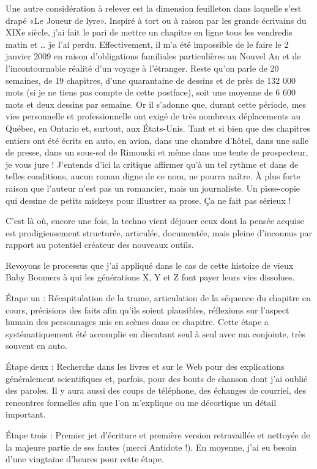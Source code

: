 \begin{Postface}
Une autre considération à relever est la dimension feuilleton dans laquelle s’est drapé «Le Joueur de lyre». Inspiré à tort ou à raison par les grands écrivains du XIXe siècle, j’ai fait le pari de mettre un chapitre en ligne tous les vendredis matin et … je l’ai perdu. Effectivement, il m’a été impossible de le faire le 2 janvier 2009 en raison d’obligations familiales particulières au Nouvel An et de l’incontournable réalité d’un voyage à l’étranger. Reste qu’on parle de 20 semaines, de 19 chapitres, d’une quarantaine de dessins et de près de 132 000 mots (si je ne tiens pas compte de cette postface), soit une moyenne de 6 600 mots et deux dessins par semaine. Or il s’adonne que, durant cette période, mes vies personnelle et professionnelle ont exigé de très nombreux déplacements au Québec, en Ontario et, surtout, aux États-Unis. Tant et si bien que des chapitres entiers ont été écrits en auto, en avion, dans une chambre d’hôtel, dans une salle de presse, dans un sous-sol de Rimouski et même dans une tente de prospecteur, je vous jure ! J’entends d’ici la critique affirmer qu’à un tel rythme et dans de telles conditions, aucun roman digne de ce nom, ne pourra naître. À plus forte raison que l’auteur n’est pas un romancier, mais un journaliste. Un pisse-copie qui dessine de petits mickeys pour illustrer sa prose. Ça ne fait pas sérieux !

C’est là où, encore une fois, la techno vient déjouer ceux dont la pensée acquise est prodigieusement structurée, articulée, documentée, mais pleine d’inconnus par rapport au potentiel créateur des nouveaux outils.

Revoyons le processus que j’ai appliqué dans le cas de cette histoire de vieux Baby Boomers à qui les générations X, Y et Z font payer leurs vies dissolues.

Étape un : Récapitulation de la trame, articulation de la séquence du chapitre en cours, précisions des faits afin qu’ils soient plausibles, réflexions sur l’aspect humain des personnages mis en scènes dans ce chapitre. Cette étape a systématiquement été accomplie en discutant seul à seul avec ma conjointe, très souvent en auto.

Étape deux : Recherche dans les livres et sur le Web pour des explications généralement scientifiques et, parfois, pour des bouts de chanson dont j’ai oublié des paroles. Il y aura aussi des coups de téléphone, des échanges de courriel, des rencontres formelles afin que l’on m’explique ou me décortique un détail important.

Étape trois : Premier jet d’écriture et première version retravaillée et nettoyée de la majeure partie de ses fautes (merci Antidote !). En moyenne, j’ai eu besoin d’une vingtaine d’heures pour cette étape.


\end{Postface}
